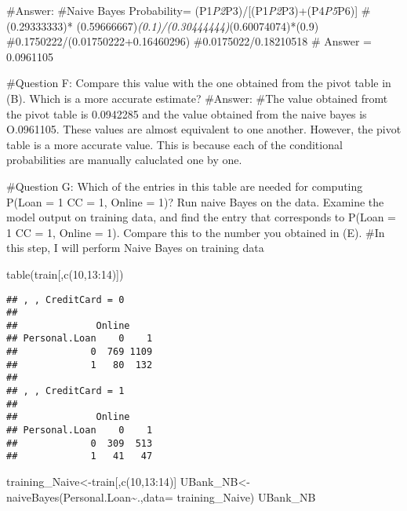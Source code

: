 \documentclass[
]{article}
\newenvironment{Shaded}{\begin{snugshade}}{\end{snugshade}}
\newcommand{\AttributeTok}[1]{\textcolor[rgb]{0.77,0.63,0.00}{#1}}
\newcommand{\DecValTok}[1]{\textcolor[rgb]{0.00,0.00,0.81}{#1}}
\newcommand{\FunctionTok}[1]{\textcolor[rgb]{0.00,0.00,0.00}{#1}}
\newcommand{\NormalTok}[1]{#1}
\newcommand{\OtherTok}[1]{\textcolor[rgb]{0.56,0.35,0.01}{#1}}
\newcommand{\SpecialCharTok}[1]{\textcolor[rgb]{0.00,0.00,0.00}{#1}}
\begin{document}
\#Answer: \#Naive Bayes Probability=
(P1\emph{P2}P3)/{[}(P1\emph{P2}P3)+(P4\emph{P5}P6){]} \#(0.29333333)*
(0.59666667)\emph{(0.1)/(0.30444444)}(0.60074074)*(0.9)
\#0.1750222/(0.01750222+0.16460296) \#0.0175022/0.18210518 \# Answer =
0.0961105

\#Question F: Compare this value with the one obtained from the pivot
table in (B). Which is a more accurate estimate? \#Answer: \#The value
obtained fromt the pivot table is 0.0942285 and the value obtained from
the naive bayes is O.0961105. These values are almost equivalent to one
another. However, the pivot table is a more accurate value. This is
because each of the conditional probabilities are manually caluclated
one by one.

\#Question G: Which of the entries in this table are needed for
computing P(Loan = 1 \textbar{} CC = 1, Online = 1)? Run naive Bayes on
the data. Examine the model output on training data, and find the entry
that corresponds to P(Loan = 1 \textbar{} CC = 1, Online = 1). Compare
this to the number you obtained in (E). \#In this step, I will perform
Naive Bayes on training data

\begin{Shaded}
\begin{Highlighting}[]
\FunctionTok{table}\NormalTok{(train[,}\FunctionTok{c}\NormalTok{(}\DecValTok{10}\NormalTok{,}\DecValTok{13}\SpecialCharTok{:}\DecValTok{14}\NormalTok{)])}
\end{Highlighting}
\end{Shaded}

\begin{verbatim}
## , , CreditCard = 0
## 
##              Online
## Personal.Loan    0    1
##             0  769 1109
##             1   80  132
## 
## , , CreditCard = 1
## 
##              Online
## Personal.Loan    0    1
##             0  309  513
##             1   41   47
\end{verbatim}

\begin{Shaded}
\begin{Highlighting}[]
\NormalTok{training\_Naive}\OtherTok{\textless{}{-}}\NormalTok{train[,}\FunctionTok{c}\NormalTok{(}\DecValTok{10}\NormalTok{,}\DecValTok{13}\SpecialCharTok{:}\DecValTok{14}\NormalTok{)]}
\NormalTok{UBank\_NB}\OtherTok{\textless{}{-}}\FunctionTok{naiveBayes}\NormalTok{(Personal.Loan}\SpecialCharTok{\textasciitilde{}}\NormalTok{.,}\AttributeTok{data=}\NormalTok{ training\_Naive) }
\NormalTok{UBank\_NB}
\end{Highlighting}
\end{Shaded}
\end{document}

